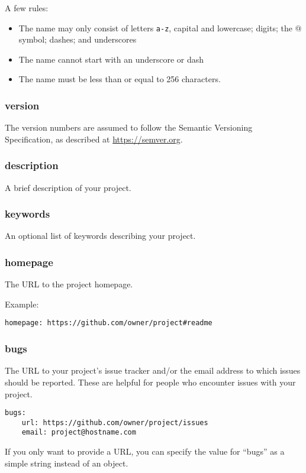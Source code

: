 \documentclass[12pt]{article}
\begin{document}
A few rules:
\begin{itemize}
	\item The name may only consist of letters \texttt{a-z}, capital and lowercase; digits; the @ symbol; dashes; and underscores
	\item The name cannot start with an underscore or dash
	\item The name must be less than or equal to 256 characters.
\end{itemize}

\subsubsection{version}
The version numbers are assumed to follow the Semantic Versioning Specification, as described at \url{https://semver.org}.

\subsubsection{description}
A brief description of your project.

\subsubsection{keywords}
An optional list of keywords describing your project.

\subsubsection{homepage}
The URL to the project homepage.

Example:

\begin{lstlisting}
homepage: https://github.com/owner/project#readme
\end{lstlisting}

\subsubsection{bugs}
The URL to your project's issue tracker and/or the email address to which issues should be reported. These are helpful for people who encounter issues with your project.

\begin{lstlisting}
bugs:
	url: https://github.com/owner/project/issues
	email: project@hostname.com
\end{lstlisting}

If you only want to provide a URL, you can specify the value for ``bugs'' as a simple string instead of an object.
\end{document}

